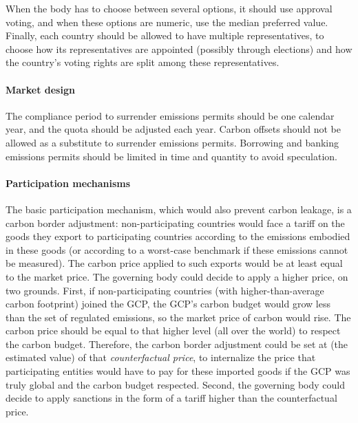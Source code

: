 \documentclass[12pt,english]{article}
\begin{document}
When the body has to choose between several options, it should use approval voting, and when these options are numeric, use the median preferred value. Finally, each country should be allowed to have multiple representatives, to choose how its representatives are appointed (possibly through elections) and how the country's voting rights are split among these representatives. 

\paragraph{Market design} 
The compliance period to surrender emissions permits should be one calendar year, and the quota should be adjusted each year. Carbon offsets should not be allowed as a substitute to surrender emissions permits. Borrowing and banking emissions permits should be limited in time and quantity to avoid speculation. %

\paragraph{Participation mechanisms}

The basic participation mechanism, which would also prevent carbon leakage, is a carbon border adjustment: non-participating countries would face a tariff on the goods they export to participating countries according to the emissions embodied in these goods (or according to a worst-case benchmark if these emissions cannot be measured). The carbon price applied to such exports would be at least equal to the market price. The governing body could decide to apply a higher price, on two grounds. First, if non-participating countries (with higher-than-average carbon footprint) joined the GCP, the GCP's carbon budget would grow less than the set of regulated emissions, so the market price of carbon would rise. The carbon price should be equal to that higher level (all over the world) to respect the carbon budget. Therefore, the carbon border adjustment could be set at (the estimated value) of that \textit{counterfactual price}, to internalize the price that participating entities would have to pay for these imported goods if the GCP was truly global and the carbon budget respected. %
Second, the governing body could decide to apply sanctions in the form of a tariff higher than the counterfactual price. 
\end{document}
